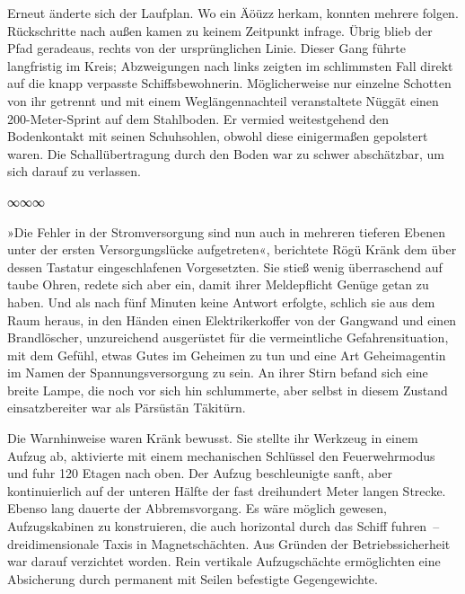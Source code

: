 Erneut änderte sich der Laufplan. Wo ein Äöüzz herkam, konnten mehrere folgen. Rückschritte nach außen kamen zu keinem Zeitpunkt infrage. Übrig blieb der Pfad geradeaus, rechts von der ursprünglichen Linie. Dieser Gang führte langfristig im Kreis; Abzweigungen nach links zeigten im schlimmsten Fall direkt auf die knapp verpasste Schiffsbewohnerin. Möglicherweise nur einzelne Schotten von ihr getrennt und mit einem Weglängennachteil veranstaltete Nüggät einen 200-Meter-Sprint auf dem Stahlboden. Er vermied weitestgehend den Bodenkontakt mit seinen Schuhsohlen, obwohl diese einigermaßen gepolstert waren. Die Schallübertragung durch den Boden war zu schwer abschätzbar, um sich darauf zu verlassen.

\begin{center}
∞∞∞
\end{center}

»Die Fehler in der Stromversorgung sind nun auch in mehreren tieferen Ebenen unter der ersten Versorgungslücke aufgetreten«, berichtete Rögü Kränk dem über dessen Tastatur eingeschlafenen Vorgesetzten. Sie stieß wenig überraschend auf taube Ohren, redete sich aber ein, damit ihrer Meldepflicht Genüge getan zu haben. Und als nach fünf Minuten keine Antwort erfolgte, schlich sie aus dem Raum heraus, in den Händen einen Elektrikerkoffer von der Gangwand und einen Brandlöscher, unzureichend ausgerüstet für die vermeintliche Gefahrensituation, mit dem Gefühl, etwas Gutes im Geheimen zu tun und eine Art Geheimagentin im Namen der Spannungsversorgung zu sein. An ihrer Stirn befand sich eine breite Lampe, die noch vor sich hin schlummerte, aber selbst in diesem Zustand einsatzbereiter war als Pärsüstän Täkitürn.

 Die Warnhinweise waren Kränk bewusst. Sie stellte ihr Werkzeug in einem Aufzug ab, aktivierte mit einem mechanischen Schlüssel den Feuerwehrmodus und fuhr 120 Etagen nach oben. Der Aufzug beschleunigte sanft, aber kontinuierlich auf der unteren Hälfte der fast dreihundert Meter langen Strecke. Ebenso lang dauerte der Abbremsvorgang. Es wäre möglich gewesen, Aufzugskabinen zu konstruieren, die auch horizontal durch das Schiff fuhren~– dreidimensionale Taxis in Magnetschächten. Aus Gründen der Betriebssicherheit war darauf verzichtet worden. Rein vertikale Aufzugschächte ermöglichten eine Absicherung durch permanent mit Seilen befestigte Gegengewichte.

